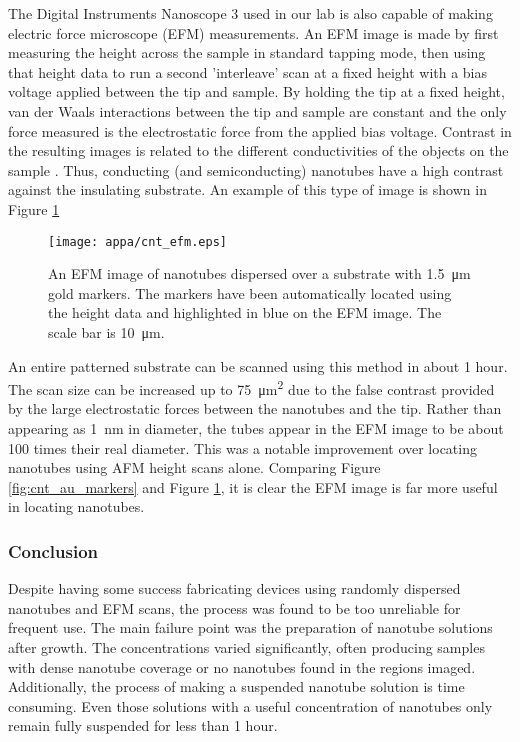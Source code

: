 The Digital Instruments Nanoscope 3 used in our lab is also capable of making electric force microscope (EFM) measurements. An EFM image is made by first measuring the height across the sample in standard tapping mode, then using that height data to run a second 'interleave' scan at a fixed height with a bias voltage applied between the tip and sample. By holding the tip at a fixed height, van der Waals interactions between the tip and sample are constant and the only force measured is the electrostatic force from the applied bias voltage. Contrast in the resulting images is related to the different conductivities of the objects on the sample \cite{Bockrath2002}. Thus, conducting (and semiconducting) nanotubes have a high contrast against the insulating  substrate. An example of this type of image is shown in Figure \ref{fig:cnt_efm}

\begin{figure}
	\centering
	\texttt{[image: appa/cnt\_efm.eps]}
	\caption{An EFM image of nanotubes dispersed over a substrate with \SI{1.5}{\micro\meter} gold markers. The markers have been automatically located using the height data and highlighted in blue on the EFM image. The scale bar is \SI{10}{\micro\meter}.}
	\label{fig:cnt_efm}
\end{figure}

An entire patterned substrate can be scanned using this method in about 1 hour. The scan size can be increased up to \SI{75}{\square\micro\meter} due to the false contrast provided by the large electrostatic forces between the nanotubes and the tip. Rather than appearing as \SI{1}{\nano\meter} in diameter, the tubes appear in the EFM image to be about 100 times their real diameter. This was a notable improvement over locating nanotubes using AFM height scans alone. Comparing Figure \ref{fig:cnt_au_markers} and Figure \ref{fig:cnt_efm}, it is clear the EFM image is far more useful in locating nanotubes.

\subsubsection{Conclusion}

Despite having some success fabricating devices using randomly dispersed nanotubes and EFM scans, the process was found to be too unreliable for frequent use. The main failure point was the preparation of nanotube solutions after growth. The concentrations varied significantly, often producing samples with dense nanotube coverage or no nanotubes found in the regions imaged. Additionally, the process of making a suspended nanotube solution is time consuming. Even those solutions with a useful concentration of nanotubes only remain fully suspended for less than 1 hour.

